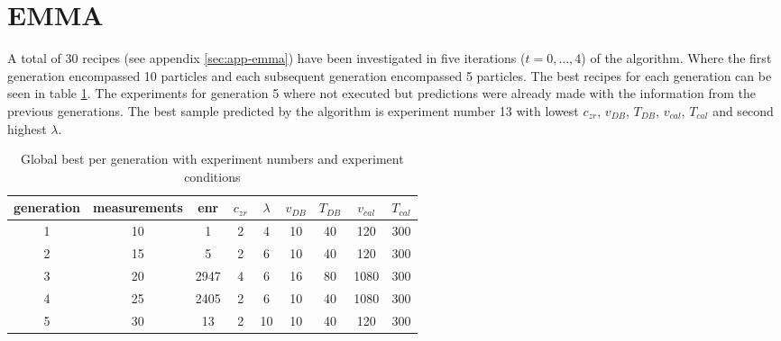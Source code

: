 \section{EMMA}
\label{sec:res-emma}
A total of 30 recipes (see appendix \ref{sec:app-emma}) have been investigated in 
five iterations ($t = 0, \dots, 4$) of the algorithm. 
Where the first generation encompassed 10 particles and each subsequent generation encompassed 5 particles. 
The best recipes for each generation can be seen in table \ref{tab:emma-Gb}. 
The experiments for generation 5 where not executed but 
predictions were already made
with the information from the previous generations. 
The best sample predicted by the algorithm is experiment number 13 with 
lowest $c_{zr}$, $v_{DB}$, $T_{DB}$, $v_{cal}$, $T_{cal}$ and second highest $\lambda$. 

\begin{table}[htb]
	\centering
	\caption{Global best per generation with experiment numbers and experiment conditions}%
	\label{tab:emma-Gb}
	\begin{tabular}{ccccccccc}
        \hline\hline
		generation& measurements &enr &$c_{zr}$ &$\lambda$ &$v_{DB}$ &$T_{DB}$ &$v_{cal}$ &$T_{cal}$\\
        \hline
	1  &10	&1       &2    &4   &10   &40  &120  &300\\
	2  &15	&5       &2    &6   &10   &40  &120  &300\\
	3  &20	&2947    &4    &6   &16   &80 &1080  &300\\
	4  &25	&2405    &2    &6   &10   &40 &1080  &300\\
	5  &30	&13      &2   &10   &10   &40  &120  &300\\
    \hline\hline
	\end{tabular}
\end{table}

